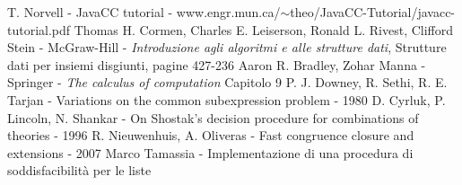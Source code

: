 \documentclass[a4paper,11pt]{article}
\begin{document}
\begin{thebibliography}{1}
T. Norvell - JavaCC tutorial - www.engr.mun.ca/$\sim$theo/JavaCC-Tutorial/javacc-tutorial.pdf
Thomas H. Cormen, Charles E. Leiserson, Ronald L. Rivest, Clifford Stein - McGraw-Hill - \textit {Introduzione agli algoritmi e alle strutture dati}, Strutture dati per insiemi disgiunti, pagine 427-236
Aaron R. Bradley, Zohar Manna - Springer - \textit {The calculus of computation} Capitolo 9 
P. J. Downey, R. Sethi, R. E. Tarjan - Variations on the common subexpression problem - 1980
D. Cyrluk, P. Lincoln, N. Shankar - On Shostak's decision procedure for combinations of theories - 1996
R. Nieuwenhuis, A. Oliveras - Fast congruence closure and extensions - 2007
Marco Tamassia - Implementazione di una procedura di soddisfacibilità per le liste
\end{thebibliography}
\end{document}
